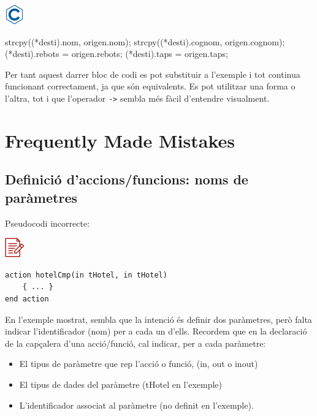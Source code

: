 \documentclass[
]{book}
\newenvironment{Shaded}{\begin{snugshade}}{\end{snugshade}}
\newcommand{\NormalTok}[1]{#1}
\providecommand{\tightlist}{%
  \setlength{\itemsep}{0pt}\setlength{\parskip}{0pt}}
\begin{document}
\includegraphics{./img/c.png}

\begin{Shaded}
\begin{Highlighting}[]
\NormalTok{    strcpy((*desti).nom, origen.nom);}
\NormalTok{    strcpy((*desti).cognom, origen.cognom);}
\NormalTok{    (*desti).rebots = origen.rebots;}
\NormalTok{    (*desti).taps = origen.taps;}
\end{Highlighting}
\end{Shaded}

Per tant aquest darrer bloc de codi es pot substituir a l'exemple i tot continua funcionant correctament, ja que són equivalents. Es pot utilitzar una forma o l'altra, tot i que l'operador \texttt{-\textgreater{}} sembla més fàcil d'entendre visualment.

\hypertarget{frequently-made-mistakes-5}{%
\section{Frequently Made Mistakes}\label{frequently-made-mistakes-5}}

\hypertarget{definiciuxf3-daccionsfuncions-noms-de-paruxe0metres}{%
\subsection{Definició d'accions/funcions: noms de paràmetres}\label{definiciuxf3-daccionsfuncions-noms-de-paruxe0metres}}

Pseudocodi incorrecte:

\includegraphics{./img/alg_err.png}

\begin{verbatim}
action hotelCmp(in tHotel, in tHotel)
    { ... }
end action
\end{verbatim}

En l'exemple mostrat, sembla que la intenció és definir dos paràmetres, però falta indicar l'identificador (nom) per a cada un d'ells. Recordem que en la declaració de la capçalera d'una acció/funció, cal indicar, per a cada paràmetre:

\begin{itemize}
\tightlist
\item
  El tipus de paràmetre que rep l'acció o funció, (in, out o inout)
\item
  El tipus de dades del paràmetre (tHotel en l'exemple)
\item
  L'identificador associat al paràmetre (no definit en l'exemple).
\end{itemize}
\end{document}
